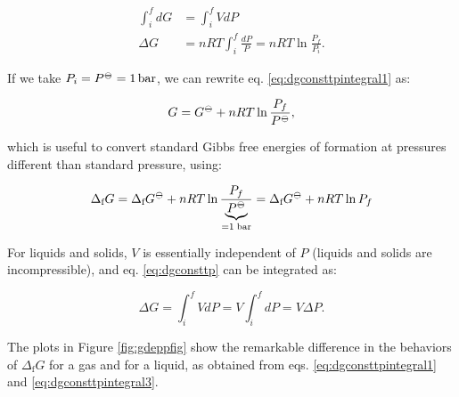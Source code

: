 \documentclass[
  9pt,
]{extbook}
\theoremstyle{definition}
\theoremstyle{definition}
\theoremstyle{definition}
\theoremstyle{remark}
\begin{document}
\begin{equation}
\begin{aligned}
\int_i^f dG &= \int_i^f VdP \\
\Delta G &= nRT \int_i^f \frac{dP}{P} = nRT \ln \frac{P_f}{P_i}.
\end{aligned}
\label{eq:dgconsttpintegral1}
\end{equation}

If we take \(P_i = P^{-\kern-6pt{\ominus}\kern-6pt-}= 1 \, \text{bar}\), we can rewrite eq. \eqref{eq:dgconsttpintegral1} as:

\begin{equation}
G = G^{-\kern-6pt{\ominus}\kern-6pt-}+ nRT \ln \frac{P_f}{P^{-\kern-6pt{\ominus}\kern-6pt-}},
\label{eq:dgconsttpintegral2}
\end{equation}

which is useful to convert standard Gibbs free energies of formation at pressures different than standard pressure, using:

\begin{equation}
\Delta_{\text{f}} G = \Delta_{\text{f}} G^{-\kern-6pt{\ominus}\kern-6pt-}+ nRT \ln \frac{P_f}{\underbrace{P^{-\kern-6pt{\ominus}\kern-6pt-}}_{=1 \; \text{bar}}} = \Delta_{\text{f}} G^{-\kern-6pt{\ominus}\kern-6pt-}+ nRT \ln P_f
\label{eq:dgconsttpintegral2b}
\end{equation}

For liquids and solids, \(V\) is essentially independent of \(P\) (liquids and solids are incompressible), and eq. \eqref{eq:dgconsttp} can be integrated as:

\begin{equation}
\Delta G = \int_i^f VdP = V \int_i^f dP = V \Delta P.
\label{eq:dgconsttpintegral3}
\end{equation}

The plots in Figure \ref{fig:gdeppfig} show the remarkable difference in the behaviors of \(\Delta_{\text{f}} G\) for a gas and for a liquid, as obtained from eqs. \eqref{eq:dgconsttpintegral1} and \eqref{eq:dgconsttpintegral3}.
\end{document}
